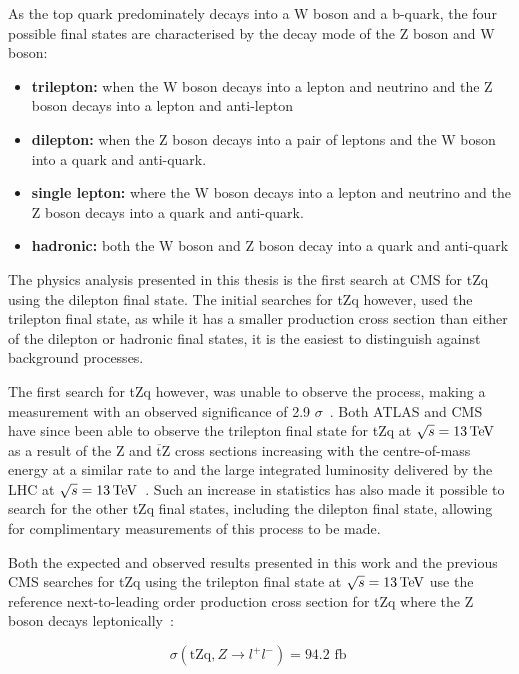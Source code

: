 As the top quark predominately decays into a W boson and a b-quark, the four possible final states are characterised by the decay mode of the Z boson and W boson:
\begin{itemize}
\item \textbf{trilepton:} when the W boson decays into a lepton and neutrino and the Z boson decays into a lepton and anti-lepton
\item \textbf{dilepton:} when the Z boson decays into a pair of leptons and the W boson into a quark and anti-quark. 
\item \textbf{single lepton:} where the W boson decays into a lepton and neutrino and the Z boson decays into a quark and anti-quark.
\item \textbf{hadronic:} both the W boson and Z boson decay into a quark and anti-quark
\end{itemize}

The physics analysis presented in this thesis is the first search at CMS for tZq using the dilepton final state.
The initial searches for tZq however, used the trilepton final state, as while it has a smaller production cross section than either of the dilepton or hadronic final states, it is the easiest to distinguish against background processes.

The first search for tZq however, was unable to observe the process, making a measurement with an observed significance of 2.9 $\sigma$~\cite{Sirunyan:2017kkr}.
Both ATLAS and CMS have since been able to observe the trilepton final state for tZq at $\sqrt{s} = 13\,\text{Te\hspace{-.08em}V}$ as a result of the Z and $\overline{\text{t}}$Z cross sections increasing with the centre-of-mass energy at a similar rate to \ttZ and the large integrated luminosity delivered by the LHC at $\sqrt{s} = 13\,\text{Te\hspace{-.08em}V}$~\cite{Aaboud:2017ylb,Sirunyan:2017nbr}.
Such an increase in statistics has also made it possible to search for the other tZq final states, including the dilepton final state, allowing for complimentary measurements of this process to be made.

Both the expected and observed results presented in this work and the previous CMS searches for tZq using the trilepton final state at $\sqrt{s} = 13\,\text{Te\hspace{-.08em}V}$ use the reference next-to-leading order production cross section for tZq where the Z boson decays leptonically~\cite{Sirunyan:2017nbr}:

\begin{equation}
\sigma ( \textrm{tZq}, Z \rightarrow l^{+} l^{-}) = \textrm{94.2 fb} \;
\label{tZqCrossSection}
\end{equation}

